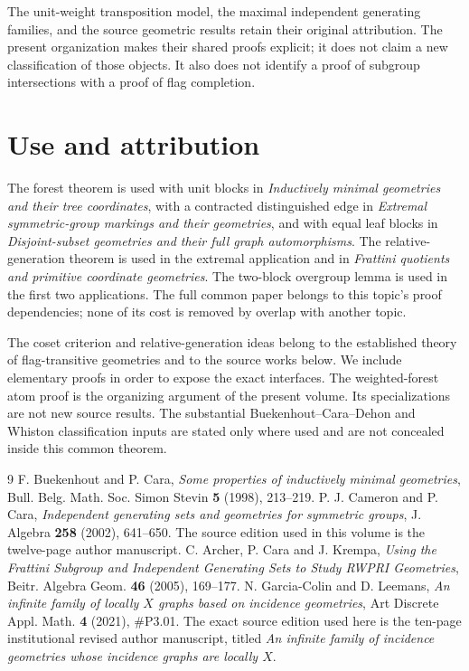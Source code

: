 The unit-weight transposition model, the maximal independent generating
families, and the source geometric results retain their original
attribution. The present organization makes their shared proofs explicit;
it does not claim a new classification of those objects. It also does not
identify a proof of subgroup intersections with a proof of flag completion.






\section*{Use and attribution}
The forest theorem is used with unit blocks in \emph{Inductively minimal
geometries and their tree coordinates}, with a contracted distinguished
edge in \emph{Extremal symmetric-group markings and their geometries}, and
with equal leaf blocks in \emph{Disjoint-subset geometries and their full
graph automorphisms}. The relative-generation theorem is used in the
extremal application and in \emph{Frattini quotients and primitive coordinate
geometries}. The two-block overgroup lemma is used in the first two
applications. The full common paper belongs to this topic's proof
dependencies; none of its cost is removed by overlap with another topic.

The coset criterion and relative-generation ideas belong to the established
theory of flag-transitive geometries and to the source works below. We
include elementary proofs in order to expose the exact interfaces. The
weighted-forest atom proof is the organizing argument of the present
volume. Its specializations are not new source results. The substantial
Buekenhout--Cara--Dehon and Whiston classification inputs are stated only
where used and are not concealed inside this common theorem.

\begin{thebibliography}{9}
 F. Buekenhout and P. Cara,
\emph{Some properties of inductively minimal geometries},
Bull. Belg. Math. Soc. Simon Stevin \textbf{5} (1998), 213--219.
 P. J. Cameron and P. Cara,
\emph{Independent generating sets and geometries for symmetric groups},
J. Algebra \textbf{258} (2002), 641--650. The source edition used in this
volume is the twelve-page author manuscript.
 C. Archer, P. Cara and J. Krempa,
\emph{Using the Frattini Subgroup and Independent Generating Sets to Study
RWPRI Geometries}, Beitr. Algebra Geom. \textbf{46} (2005), 169--177.
 N. Garcia-Colin and D. Leemans,
\emph{An infinite family of locally $X$ graphs based on incidence geometries},
Art Discrete Appl. Math. \textbf{4} (2021), \#P3.01. The exact source
edition used here is the ten-page institutional revised author manuscript,
titled \emph{An infinite family of incidence geometries whose incidence
graphs are locally $X$}.
\end{thebibliography}

